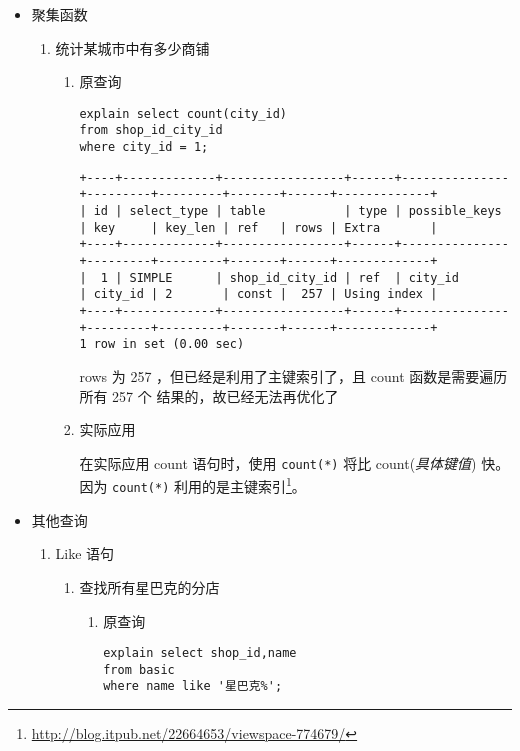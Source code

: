 \documentclass[11pt]{article}
\begin{document}
\begin{itemize}
\begin{enumerate}
\begin{enumerate}
rows 也为 1 ，效率显著提高
\end{enumerate}
\end{enumerate}
\item 聚集函数
\label{sec-3-2-3-3}
\begin{enumerate}
\item 统计某城市中有多少商铺
\begin{enumerate}
\item 原查询

\begin{lstlisting}
explain select count(city_id)
from shop_id_city_id
where city_id = 1;
\end{lstlisting}

\begin{verbatim}
+----+-------------+-----------------+------+---------------+---------+---------+-------+------+-------------+
| id | select_type | table           | type | possible_keys | key     | key_len | ref   | rows | Extra       |
+----+-------------+-----------------+------+---------------+---------+---------+-------+------+-------------+
|  1 | SIMPLE      | shop_id_city_id | ref  | city_id       | city_id | 2       | const |  257 | Using index |
+----+-------------+-----------------+------+---------------+---------+---------+-------+------+-------------+
1 row in set (0.00 sec)
\end{verbatim}

rows 为 257 ，但已经是利用了主键索引了，且 count 函数是需要遍历所有 257 个
结果的，故已经无法再优化了

\item 实际应用

在实际应用 count 语句时，使用 \texttt{count(*)} 将比 count(\emph{具体键值}) 快。因为
\texttt{count(*)} 利用的是主键索引\footnote{\url{http://blog.itpub.net/22664653/viewspace-774679/}}。
\end{enumerate}
\end{enumerate}
\item 其他查询
\label{sec-3-2-3-4}
\begin{enumerate}
\item Like 语句
\begin{enumerate}
\item 查找所有星巴克的分店
\begin{enumerate}
\item 原查询

\begin{lstlisting}
explain select shop_id,name
from basic
where name like '星巴克%';
\end{lstlisting}


\end{enumerate}
\end{enumerate}
\end{enumerate}
\end{itemize}
\end{document}
